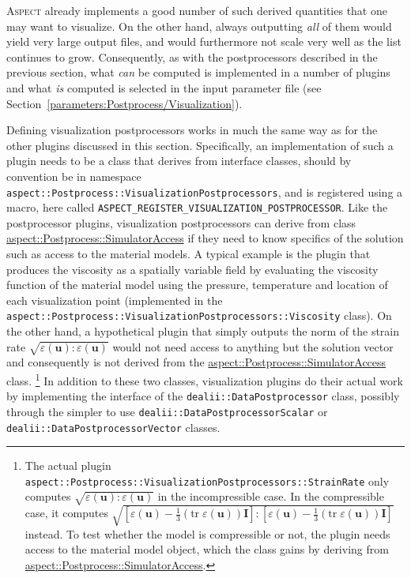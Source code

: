 \documentclass{article}
\newcommand{\aspect}{\textsc{Aspect}}
\begin{document}
\aspect{} already implements a good number of such derived quantities that one
may want to visualize. On the other hand, always outputting \textit{all} of
them would yield very large output files, and would furthermore not scale very
well as the list continues to grow. Consequently, as with the postprocessors
described in the previous section, what \textit{can} be computed is
implemented in a number of plugins and what \textit{is} computed is selected
in the input parameter file (see
Section~\ref{parameters:Postprocess/Visualization}).

Defining visualization postprocessors works in much the same way as for the
other plugins discussed in this section. Specifically, an implementation of
such a plugin needs to be a class that derives from interface classes,
should by convention be in namespace
\texttt{aspect::Postprocess::VisualizationPostprocessors},
and is registered using a macro, here called
\texttt{ASPECT\_REGISTER\_VISUALIZATION\_POSTPROCESSOR}. Like the
postprocessor plugins, visualization postprocessors can derive from class
\href{doc/doxygen/classaspect_1_1Postprocess_1_1SimulatorAccess.html}{aspect::Postprocess::SimulatorAccess} if they need to know specifics
of the solution such as access to the material models. A typical example is
the plugin that produces the viscosity as a spatially variable field by
evaluating the viscosity function of the material model using the pressure,
temperature and location of each visualization point (implemented in the
\texttt{aspect::Postprocess::VisualizationPostprocessors::Viscosity}
class). On the other hand, a hypothetical plugin
that
simply outputs the norm of the strain rate $\sqrt{\varepsilon(\mathbf
  u):\varepsilon(\mathbf u)}$ would not need access to anything but the
solution vector and consequently is not derived from the
\href{doc/doxygen/classaspect_1_1Postprocess_1_1SimulatorAccess.html}{aspect::Postprocess::SimulatorAccess}
class.%
\footnote{The actual plugin
  \texttt{aspect::Postprocess::VisualizationPostprocessors::StrainRate}
  only computes $\sqrt{\varepsilon(\mathbf
    u):\varepsilon(\mathbf u)}$ in the incompressible case. In the compressible
  case, it computes
  $\sqrt{[\varepsilon(\mathbf u)-\tfrac 13(\textrm{tr}\;\varepsilon(\mathbf
    u))\mathbf I]:[\varepsilon(\mathbf u)-\tfrac
    13(\textrm{tr}\;\varepsilon(\mathbf u))\mathbf I]}$ instead. To test whether
  the model is compressible or not, the plugin needs access to the material
  model object, which the class gains by deriving from
  \href{doc/doxygen/classaspect_1_1Postprocess_1_1SimulatorAccess.html}{aspect::Postprocess::SimulatorAccess}.}
In addition to these two classes, visualization plugins do their actual work
by implementing the interface of the \texttt{dealii::DataPostprocessor} class,
possibly through the simpler to use \texttt{dealii::DataPostprocessorScalar}
or \texttt{dealii::DataPostprocessorVector} classes.
\end{document}
